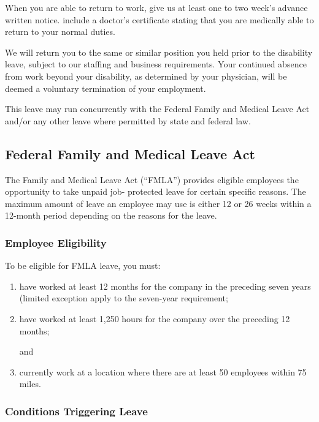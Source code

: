 When you are able to return to work, give us at least one to two week's advance written notice. include a doctor's certificate stating that you are medically able to return to your normal duties.

We will return you to the same or similar position you held prior to the disability leave, subject to our staffing and business requirements. Your continued absence from work beyond your disability, as determined by your physician, will be deemed a voluntary termination of your employment.

This leave may run concurrently with the Federal Family and Medical Leave Act and/or any other leave where permitted by state and federal law.

\subsection{Federal Family and Medical Leave Act}

The Family and Medical Leave Act (“FMLA”) provides eligible employees the opportunity to take unpaid job- protected leave for certain specific reasons. The maximum amount of leave an employee may use is either 12 or 26 weeks within a 12-month period depending on the reasons for the leave.

\subsubsection{Employee Eligibility}

To be eligible for FMLA leave, you must:

\begin{enumerate} 	\item have worked at least 12 months for the company 	in the preceding seven years (limited exception 	apply to the seven-year requirement;
	
	\item have worked at least 1,250 hours for the 	company over the preceding 12 months;
	
	and
	
	\item currently work at a location where there are at 	least 50 employees within 75 miles. \end{enumerate}

\subsubsection{Conditions Triggering Leave}

